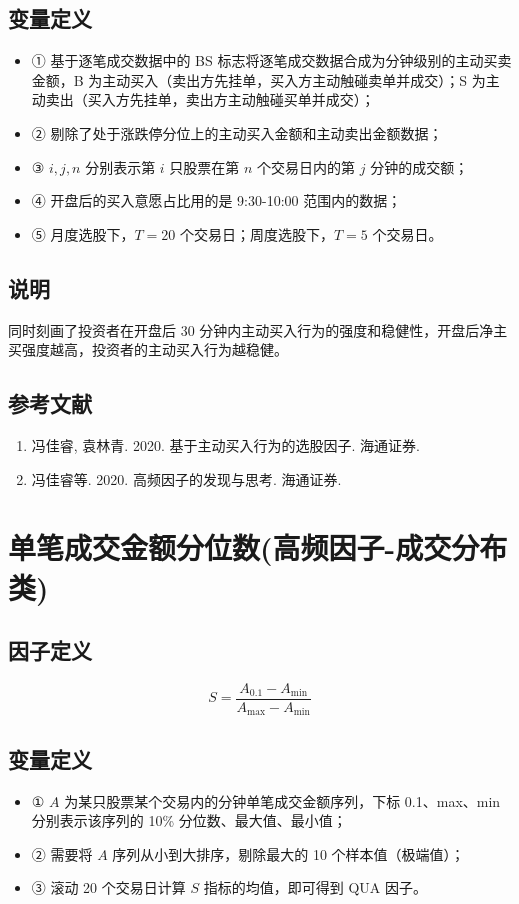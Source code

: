 \documentclass{article}
\begin{document}
\subsection{变量定义}
\begin{itemize}
    \item ① 基于逐笔成交数据中的 BS 标志将逐笔成交数据合成为分钟级别的主动买卖金额，B 为主动买入（卖出方先挂单，买入方主动触碰卖单并成交）；S 为主动卖出（买入方先挂单，卖出方主动触碰买单并成交）；
    \item ② 剔除了处于涨跌停分位上的主动买入金额和主动卖出金额数据；
    \item ③ \(i, j, n\) 分别表示第 \(i\) 只股票在第 \(n\) 个交易日内的第 \(j\) 分钟的成交额；
    \item ④ 开盘后的买入意愿占比用的是 9:30-10:00 范围内的数据；
    \item ⑤ 月度选股下，\(T=20\) 个交易日；周度选股下，\(T=5\) 个交易日。
\end{itemize}

\subsection{说明}
同时刻画了投资者在开盘后 30 分钟内主动买入行为的强度和稳健性，开盘后净主买强度越高，投资者的主动买入行为越稳健。

\subsection{参考文献}
\begin{enumerate}
    \item 冯佳睿, 袁林青. 2020. 基于主动买入行为的选股因子. 海通证券.
    \item 冯佳睿等. 2020. 高频因子的发现与思考. 海通证券.
\end{enumerate}

\section{单笔成交金额分位数(高频因子-成交分布类)}

\subsection{因子定义}
\begin{equation}
    S = \frac{A_{0.1} - A_{\min}}{A_{\max} - A_{\min}}
\end{equation}

\subsection{变量定义}
\begin{itemize}
    \item ① \(A\) 为某只股票某个交易内的分钟单笔成交金额序列，下标 0.1、max、min 分别表示该序列的 10\% 分位数、最大值、最小值；
    \item ② 需要将 \(A\) 序列从小到大排序，剔除最大的 10 个样本值（极端值）；
    \item ③ 滚动 20 个交易日计算 \(S\) 指标的均值，即可得到 \(\mathrm{QUA}\) 因子。
\end{itemize}
\end{document}
